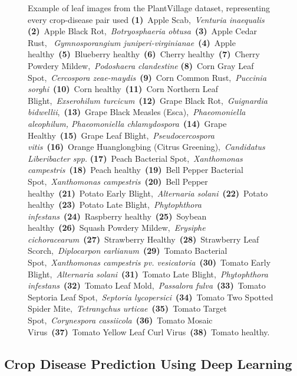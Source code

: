\begin{figure}[!h]
	\caption{\label{fig: dataset_image}Example of leaf images from the PlantVillage dataset, representing every crop-disease pair used \textbf{(1)} Apple Scab, \textit{Venturia inaequalis} \textbf{(2)} Apple Black Rot, \textit{Botryosphaeria obtusa} \textbf{(3)} Apple Cedar Rust,  \textit{Gymnosporangium juniperi-virginianae} \textbf{(4)} Apple healthy \textbf{(5)} Blueberry healthy \textbf{(6)} Cherry healthy \textbf{(7)} Cherry Powdery Mildew, \textit{Podoshaera clandestine} \textbf{(8)} Corn Gray Leaf Spot, \textit{Cercospora zeae-maydis} \textbf{(9)} Corn Common Rust, \textit{Puccinia sorghi} \textbf{(10)} Corn healthy \textbf{(11)} Corn Northern Leaf Blight, \textit{Exserohilum turcicum} \textbf{(12)} Grape Black Rot, \textit{Guignardia bidwellii}, \textbf{(13)} Grape Black Measles (Esca), \textit{Phaeomoniella aleophilum, Phaeomoniella chlamydospora} \textbf{(14)} Grape Healthy \textbf{(15)} Grape Leaf Blight, \textit{Pseudocercospora vitis} \textbf{(16)} Orange Huanglongbing (Citrus Greening), \textit{Candidatus Liberibacter spp.} \textbf{(17)} Peach Bacterial Spot, \textit{Xanthomonas campestris} \textbf{(18)} Peach healthy \textbf{(19)} Bell Pepper Bacterial Spot, \textit{Xanthomonas campestris} \textbf{(20)} Bell Pepper healthy \textbf{(21)} Potato Early Blight, \textit{Alternaria solani} \textbf{(22)} Potato healthy \textbf{(23)} Potato Late Blight, \textit{Phytophthora infestans} \textbf{(24)} Raspberry healthy \textbf{(25)} Soybean healthy \textbf{(26)} Squash Powdery Mildew, \textit{Erysiphe cichoracearum} \textbf{(27)} Strawberry Healthy \textbf{(28)} Strawberry Leaf Scorch, \textit{Diplocarpon earlianum} \textbf{(29)} Tomato Bacterial Spot, \textit{Xanthomonas campestris pv. vesicatoria} \textbf{(30)} Tomato Early Blight, \textit{Alternaria solani} \textbf{(31)} Tomato Late Blight, \textit{Phytophthora infestans} \textbf{(32)} Tomato Leaf Mold, \textit{Passalora fulva} \textbf{(33)} Tomato Septoria Leaf Spot, \textit{Septoria lycopersici} \textbf{(34)} Tomato Two Spotted Spider Mite, \textit{Tetranychus urticae} \textbf{(35)} Tomato Target Spot, \textit{Corynespora cassiicola} \textbf{(36)} Tomato Mosaic Virus \textbf{(37)} Tomato Yellow Leaf Curl Virus \textbf{(38)} Tomato healthy.}
\end{figure}


\subsection{Crop Disease Prediction Using Deep Learning}

